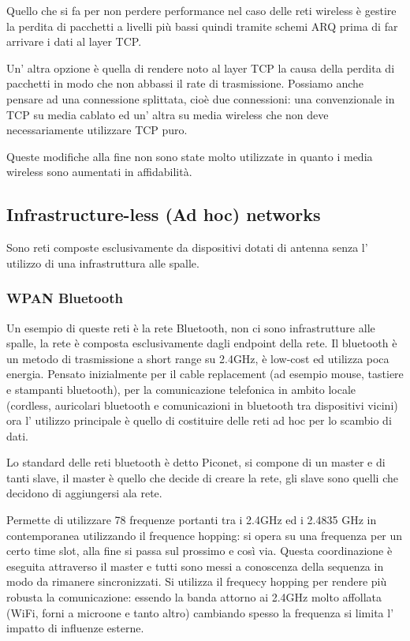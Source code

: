 Quello che si fa per non perdere performance nel caso delle reti wireless è gestire la perdita di pacchetti a livelli più bassi quindi tramite schemi ARQ prima di far arrivare i dati al layer TCP.

Un' altra opzione è quella di rendere noto al layer TCP la causa della perdita di pacchetti in modo che non abbassi il rate di trasmissione.
Possiamo anche pensare ad una connessione splittata, cioè due connessioni: una convenzionale in TCP su media cablato ed un' altra su media wireless che non deve necessariamente utilizzare TCP puro.

Queste modifiche alla fine non sono state molto utilizzate in quanto i media wireless sono aumentati in affidabilità.


\subsection{Infrastructure-less (Ad hoc) networks}
Sono reti composte esclusivamente da dispositivi dotati di antenna senza l' utilizzo di una infrastruttura alle spalle.

\subsubsection{WPAN Bluetooth}
Un esempio di queste reti è la rete Bluetooth, non ci sono infrastrutture alle spalle, la rete è composta esclusivamente dagli endpoint della rete.
Il bluetooth è un metodo di trasmissione a short range su 2.4GHz, è low-cost ed utilizza poca energia.
Pensato inizialmente per il cable replacement (ad esempio mouse, tastiere e stampanti bluetooth), per la comunicazione telefonica in ambito locale (cordless, auricolari bluetooth e comunicazioni in bluetooth tra dispositivi vicini) ora l' utilizzo principale è quello di costituire delle reti ad hoc per lo scambio di dati.

Lo standard delle reti bluetooth è detto Piconet, si compone di un master e di tanti slave, il master è quello che decide di creare la rete, gli slave sono quelli che decidono di aggiungersi ala rete.

Permette di utilizzare 78 frequenze portanti tra i 2.4GHz ed i 2.4835 GHz in contemporanea utilizzando il frequence hopping: si opera su una frequenza per un certo time slot, alla fine si passa sul prossimo e così via.
Questa coordinazione è eseguita attraverso il master e tutti sono messi a conoscenza della sequenza in modo da rimanere sincronizzati.
Si utilizza il frequecy hopping per rendere più robusta la comunicazione: essendo la banda attorno ai 2.4GHz molto affollata (WiFi, forni a microone e tanto altro) cambiando spesso la frequenza si limita l' impatto di influenze esterne.

